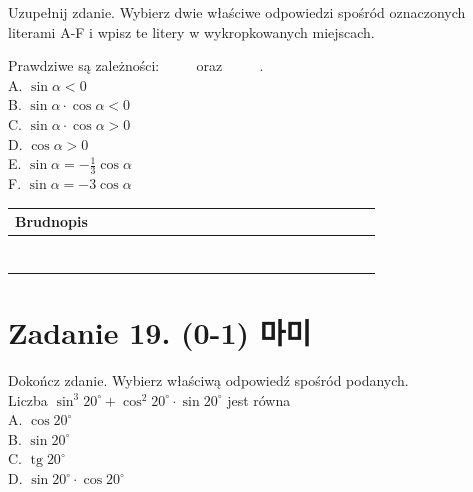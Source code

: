 \documentclass[10pt]{article}
\begin{document}
Uzupełnij zdanie. Wybierz dwie właściwe odpowiedzi spośród oznaczonych literami A-F i wpisz te litery w wykropkowanych miejscach.

Prawdziwe są zależności: \(\qquad\) oraz \(\qquad\) .\\
A. \(\sin \alpha<0\)\\
B. \(\sin \alpha \cdot \cos \alpha<0\)\\
C. \(\sin \alpha \cdot \cos \alpha>0\)\\
D. \(\cos \alpha>0\)\\
E. \(\sin \alpha=-\frac{1}{3} \cos \alpha\)\\
F. \(\sin \alpha=-3 \cos \alpha\)

\begin{center}
\begin{tabular}{|c|c|c|c|c|c|c|c|c|c|c|c|c|c|c|c|c|c|c|c|c|c|c|c|}
\hline
\multicolumn{4}{|l|}{Brudnopis} &  &  &  &  &  &  &  &  &  &  &  &  &  &  &  &  &  &  &  &  \\
\hline
 &  &  &  &  &  &  &  &  &  &  &  &  &  &  &  &  &  &  &  &  &  &  &  \\
\hline
 &  &  &  &  &  &  &  &  &  &  &  &  &  &  &  &  &  &  &  &  &  &  &  \\
\hline
 &  &  &  &  &  &  &  &  &  &  &  &  &  &  &  &  &  &  &  &  &  &  &  \\
\hline
 &  &  &  &  &  &  &  &  &  &  &  &  &  &  &  &  &  &  &  &  &  &  &  \\
\hline
 &  &  &  &  &  &  &  &  &  &  &  &  &  &  &  &  &  &  &  &  &  &  &  \\
\hline
 &  &  &  &  &  &  &  &  &  &  &  &  &  &  &  &  &  &  &  &  &  &  &  \\
\hline
 &  &  &  &  &  &  &  &  &  &  &  &  &  &  &  &  &  &  &  &  &  &  &  \\
\hline
\end{tabular}
\end{center}

\section*{Zadanie 19. (0-1) 마미}
Dokończ zdanie. Wybierz właściwą odpowiedź spośród podanych.\\
Liczba \(\sin ^{3} 20^{\circ}+\cos ^{2} 20^{\circ} \cdot \sin 20^{\circ}\) jest równa\\
A. \(\cos 20^{\circ}\)\\
B. \(\sin 20^{\circ}\)\\
C. \(\operatorname{tg} 20^{\circ}\)\\
D. \(\sin 20^{\circ} \cdot \cos 20^{\circ}\)
\end{document}

